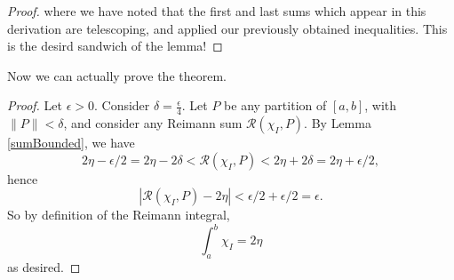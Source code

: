 \documentclass[12pt, letterpaper]{article}
\newcommand\norm[1]{\lVert#1\rVert} %
\newcommand\rsum[2]{\mathcal{R} (#1,#2)} %
\theoremstyle{definition}
\begin{document}
\begin{proof}
        where we have noted that the first and last sums which appear in this derivation are telescoping, and applied our previously obtained inequalities. This is the desird sandwich of the lemma!
    \end{proof}


    Now we can actually prove the theorem.

    \begin{proof}
        Let $\epsilon > 0$. Consider $\delta = \frac{\epsilon}{4}$. Let $P$ be any partition of $[a,b]$, with $\norm{P} < \delta$, and consider any Reimann sum $\rsum{\chi_I}{P}$. By Lemma \ref{sumBounded}, we have 
        \[
            2\eta - \epsilon/2 = 2\eta - 2\delta < 
            \rsum{\chi_I}{P} < 2\eta + 2\delta = 2\eta + \epsilon/2 ,
            \]
        hence
        \[
            \left| \rsum{\chi_I}{P} - 2\eta \right| < \epsilon/2 + \epsilon/2 = \epsilon.
            \]
        So by definition of the Reimann integral,
        \[
            \int_a^b \chi_I = 2\eta
            \]
        as desired.
    \end{proof}
\end{document}

